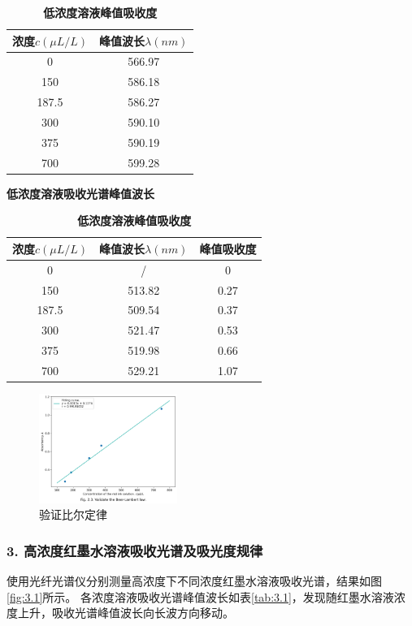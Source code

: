 \documentclass[12pt,a4paper,UTF8]{ctexart}
\begin{document}
\begin{table}[htbp]
	\centering
	\begin{minipage}{0.45\linewidth}
		\begin{tabular}{cc}
			\toprule
			浓度$c(\mu L/L)$ &峰值波长$\lambda (nm)$ \\
			\midrule
			0 &566.97 \\		
			150 &586.18 \\
			187.5 &586.27 \\
			300 &590.10 \\
			375 &590.19 \\
			700 &599.28 \\
			\bottomrule
		\end{tabular}
		\caption{\textbf{低浓度溶液吸收光谱峰值波长}}
		\label{tab:2.1}
	\end{minipage}
	\begin{minipage}{0.45\linewidth}
		\begin{tabular}{ccc}
			\toprule
			浓度$c(\mu L/L)$ &峰值波长$\lambda (nm)$ &峰值吸收度 \\
			\midrule
			0 &/ &0 \\		
			150 &513.82 &0.27 \\
			187.5 &509.54 &0.37 \\
			300 &521.47 &0.53 \\
			375 &519.98 &0.66 \\
			700 &529.21 &1.07 \\
			\bottomrule
		\end{tabular}
		\caption{\textbf{低浓度溶液峰值吸收度}}
		\label{tab:2.2}
	\end{minipage}
\end{table}

\begin{figure}[htbp]
	\centering
	\includegraphics[width=0.4\textwidth]{attachments//Fig.2.3.png}
	\caption{验证比尔定律}
	\label{fig:2.3}
\end{figure}


\subsubsection*{3. 高浓度红墨水溶液吸收光谱及吸光度规律}
使用光纤光谱仪分别测量高浓度下不同浓度红墨水溶液吸收光谱，结果如图\ref{fig:3.1}所示。
各浓度溶液吸收光谱峰值波长如表\ref{tab:3.1}，发现随红墨水溶液浓度上升，吸收光谱峰值波长向长波方向移动。
\end{document}
